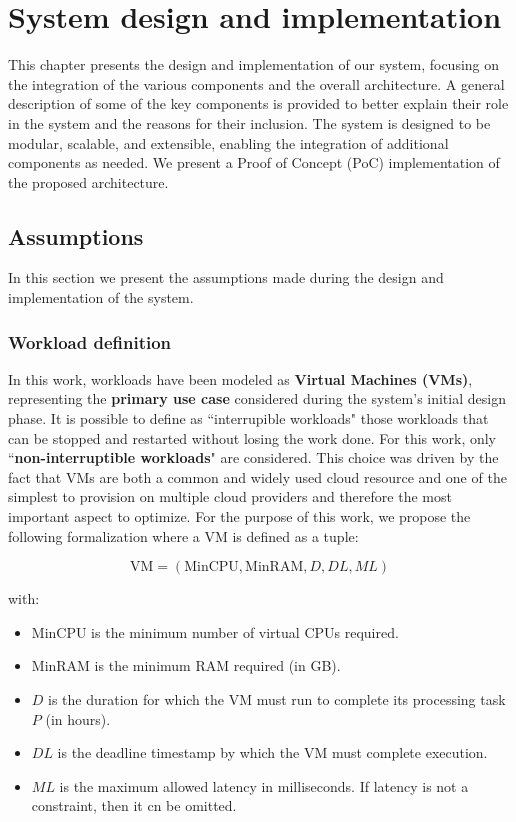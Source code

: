 \chapter{System design and implementation}
\label{cha:design}

This chapter presents the design and implementation of our system, focusing on the integration of the various components and the overall architecture. 
A general description of some of the key components is provided to better explain their role in the system and the reasons for their inclusion.
The system is designed to be modular, scalable, and extensible, enabling the integration of additional components as needed.
We present a Proof of Concept (PoC) implementation of the proposed architecture.

\section{Assumptions}

In this section we present the assumptions made during the design and implementation of the system. 

\subsection{Workload definition}
\label{sec:workload_definition}
In this work, workloads have been modeled as \textbf{Virtual Machines (VMs)}, representing the \textbf{primary use case} considered during the system's initial design phase. 
It is possible to define as ``interrupible workloads" those workloads that can be stopped and restarted without losing the work done. 
For this work, only ``\textbf{non-interruptible workloads}" are considered.
This choice was driven by the fact that VMs are both a common and widely used cloud resource and one of the simplest to provision on multiple cloud providers and therefore the most important aspect to optimize.
For the purpose of this work, we propose the following formalization where a VM is  defined as a tuple:

\[
\text{VM} = (\text{MinCPU}, \text{MinRAM}, D, DL, ML)
\]

with:
\begin{itemize}[itemsep=0.2pt, topsep=1pt]
    \item \( \text{MinCPU} \) is the minimum number of virtual CPUs required.
    \item \( \text{MinRAM} \) is the minimum RAM required (in GB).
    \item \( D \) is the duration for which the VM must run to complete its processing task \( P \) (in hours).
    \item \( DL \) is the deadline timestamp by which the VM must complete execution.
    \item \( ML \) is the maximum allowed latency in milliseconds. If latency is not a constraint, then it cn be omitted. \\
\end{itemize}

